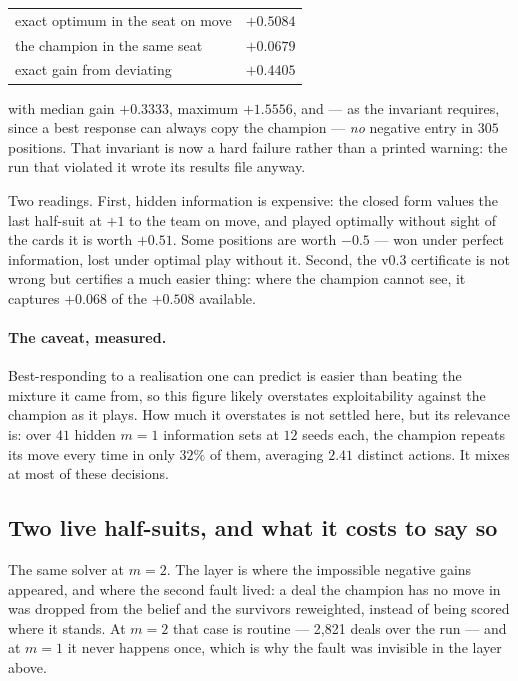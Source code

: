 \documentclass[11pt,a4paper]{article}
\begin{document}
\begin{center}
\begin{tabular}{lr}
\toprule
exact optimum in the seat on move & $+0.5084$ \\
the champion in the same seat & $+0.0679$ \\
\midrule
exact gain from deviating & $\mathbf{+0.4405}$ \\
\bottomrule
\end{tabular}
\end{center}

with median gain $+0.3333$, maximum $+1.5556$, and --- as the invariant
requires, since a best response can always copy the champion --- \emph{no}
negative entry in $305$ positions. That invariant is now a hard
failure rather than a printed warning: the run that violated it wrote its
results file anyway.

Two readings. First, hidden information is expensive: the closed form values
the last half-suit at $+1$ to the team on move, and played optimally without
sight of the cards it is worth $+0.51$. Some positions are worth $-0.5$ ---
won under perfect information, lost under optimal play without it. Second, the
v0.3 certificate is not wrong but certifies a much easier thing: where the
champion cannot see, it captures $+0.068$ of the $+0.508$ available.

\paragraph{The caveat, measured.} Best-responding to a realisation one can
predict is easier than beating the mixture it came from, so this figure likely
overstates exploitability against the champion as it plays. How much it
overstates is not settled here, but its relevance is: over $41$ hidden $m = 1$
information sets at $12$ seeds each, the champion repeats its move every time
in only $32\%$ of them, averaging $2.41$ distinct actions. It mixes at most of
these decisions.

\subsection{Two live half-suits, and what it costs to say so}
\label{sec:iim2}

The same solver at $m = 2$. The layer is where the impossible negative gains
appeared, and where the second fault lived: a deal the champion has no move in
was dropped from the belief and the survivors reweighted, instead of being
scored where it stands. At $m = 2$ that case is routine --- 2,821 deals over
the run --- and at $m = 1$ it never happens once, which is why the fault was
invisible in the layer above.
\end{document}
